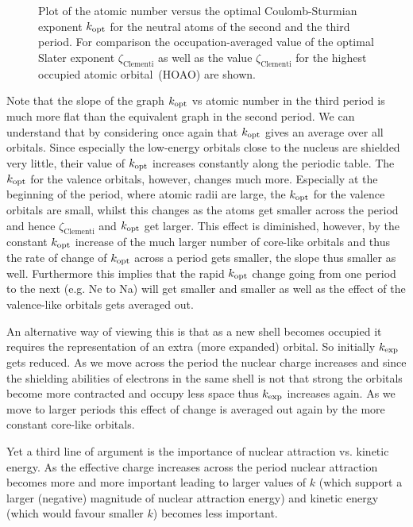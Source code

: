 \begin{figure}
	\centering
	\caption{Plot of the atomic number versus the optimal Coulomb-Sturmian exponent
		$k_\text{opt}$ for the neutral atoms of the second and the third period.
		For comparison the occupation-averaged value of the \citet{Clementi1963} optimal
		Slater exponent $\zeta_\text{Clementi}$ as well as the
		value $\zeta_\text{Clementi}$ for the highest occupied atomic orbital~(HOAO)
		are shown.
	}
	\label{fig:KoptVsAtnum}
\end{figure}

Note that the slope of the graph $k_\text{opt}$ vs atomic number in the third period
is much more flat than the equivalent graph in the second period.
We can understand that by considering once again
that $k_\text{opt}$ gives an average over all orbitals.
Since especially the low-energy orbitals close to the nucleus
are shielded very little,
their value of $k_\text{opt}$ increases constantly along the periodic table.
The $k_\text{opt}$ for the valence orbitals, however, changes much more.
Especially at the beginning of the period, where atomic radii are large,
the $k_\text{opt}$ for the valence orbitals are small,
whilst this changes as the atoms get smaller across the period
and hence $\zeta_\text{Clementi}$ and $k_\text{opt}$ get larger.
This effect is diminished, however,
by the constant $k_\text{opt}$ increase of the
much larger number of core-like orbitals
and thus the rate of change of $k_\text{opt}$ across a period gets smaller,
the slope thus smaller as well.
Furthermore this implies that the rapid $k_\text{opt}$ change
going from one period to the next (e.g. Ne to Na)
will get smaller and smaller as well
as the effect of the valence-like orbitals gets averaged out.

An alternative way of viewing this is
that as a new shell becomes occupied it requires
the representation of an extra (more expanded) orbital.
So initially $k_\text{exp}$ gets reduced.
As we move across the period the nuclear charge increases
and since the shielding abilities of electrons in the same shell
is not that strong the orbitals become more contracted and occupy less space
thus $k_\text{exp}$ increases again.
As we move to larger periods this effect of change is averaged out
again by the more constant core-like orbitals.

Yet a third line of argument is the importance of nuclear attraction
vs. kinetic energy.
As the effective charge increases across the period
nuclear attraction becomes more and more important leading to larger values of $k$
(which support a larger (negative) magnitude of nuclear attraction energy)
and kinetic energy (which would favour smaller $k$) becomes less important.
